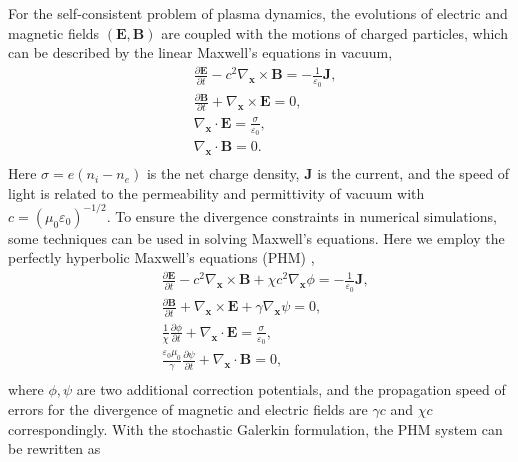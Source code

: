 \documentclass[preprint,3p,12pt,sort&compress]{elsarticle}
\begin{document}
For the self-consistent problem of plasma dynamics, the evolutions of electric and magnetic fields $(\mathbf E, \mathbf B)$ are coupled with the motions of charged particles, which can be described by the linear Maxwell's equations in vacuum,
\begin{equation}
\begin{aligned}
&\frac{\partial \mathbf E} {\partial t} - c^2 \nabla_\mathbf x \times \mathbf B = - \frac{1}{\varepsilon_0} \mathbf J, \\
&\frac{\partial \mathbf B}{\partial t} + \nabla_\mathbf x \times \mathbf E = 0, \\
&\nabla_\mathbf x \cdot \mathbf E = \frac{\sigma}{\varepsilon_0}, \\
&\nabla_\mathbf x \cdot \mathbf B = 0. \\
\end{aligned}
\end{equation}
Here $\sigma=e(n_i-n_e)$ is the net charge density, $\mathbf J$ is the current, and the speed of light is related to the permeability and permittivity of vacuum with $c=(\mu_0 \varepsilon_0)^{-1/2}$.
To ensure the divergence constraints in numerical simulations, some techniques can be used in solving Maxwell's equations. 
Here we employ the perfectly hyperbolic Maxwell's equations (PHM) \cite{munz2000divergence},
\begin{equation}
\begin{aligned}
&\frac{\partial \mathbf E} {\partial t} - c^2 \nabla_\mathbf x \times \mathbf B + \chi c^2 \nabla_\mathbf x \phi = - \frac{1}{\varepsilon_0} \mathbf J, \\
&\frac{\partial \mathbf B}{\partial t} + \nabla_\mathbf x \times \mathbf E + \gamma \nabla_\mathbf x \psi= 0, \\
&\frac{1}{\chi} \frac{\partial \phi}{\partial t} + \nabla_\mathbf x \cdot \mathbf E = \frac{\sigma}{\varepsilon_0}, \\
&\frac{\varepsilon_0 \mu_0}{\gamma} \frac{\partial \psi}{\partial t} + \nabla_\mathbf x \cdot \mathbf B = 0, \\
\end{aligned}
\label{eqn:phm}
\end{equation}
where $\phi, \psi$ are two additional correction potentials, and the propagation speed of errors for the divergence of magnetic and electric fields are $\gamma c$ and $\chi c$ correspondingly.
With the stochastic Galerkin formulation, the PHM system can be rewritten as
\end{document}
